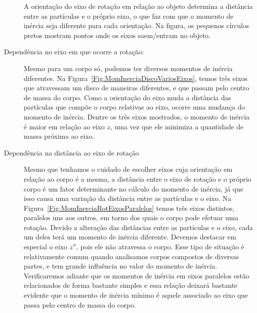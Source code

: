 \begin{description}
\begin{marginfigure}
\caption{A orientação do eixo de rotação em relação ao objeto determina a distância entre as partículas e o próprio eixo, o que faz com que o momento de inércia seja diferente para cada orientação. Na figura, os pequenos círculos pretos mostram pontos onde os eixos saem/entram no objeto. \label{Fig:MomInerciaDiscoVariosEixos}}
\end{marginfigure}
    \item[Dependência no eixo em que ocorre a rotação:] Mesmo para um corpo só, podemos ter diversos momentos de inércia diferentes. Na Figura~\ref{Fig:MomInerciaDiscoVariosEixos}, temos três eixos que atravessam um disco de maneiras diferentes, e que passam pelo centro de massa do corpo. Como a orientação do eixo muda a distância das partículas que compõe o corpo relativas ao eixo, ocorre uma mudança do momento de inércia. Dentre os três eixos mostrados, o momento de inércia é maior em relação ao eixo $z$, uma vez que ele minimiza a quantidade de massa próxima ao eixo.
    \item[Dependência na distância ao eixo de rotação] Mesmo que tenhamos o cuidado de escolher eixos cuja orientação em relação ao corpo é a mesma, a distância entre o eixo de rotação e o próprio corpo é um fator determinante no cálculo do momento de inércia, já que isso causa uma variação da distância entre as partículas e o eixo. Na Figura~\ref{Fig:MomInerciaRotEixosParalelos} temos três eixos distintos, paralelos uns aos outros, em torno dos quais o corpo pode efetuar uma rotação. Devido a alteração das distâncias entre as partículas e o eixo, cada um deles terá um momento de inércia diferente. Devemos destacar em especial o eixo $z''$, pois ele não atravessa o corpo. Esse tipo de situação é relativamente comum quando analisamos corpos compostos de diversas partes, e tem grande influência no valor do momento de inércia. Verificaremos adiante que os momentos de inércia em eixos paralelos estão relacionados de forma bastante simples e essa relação deixará bastante evidente que o momento de inércia mínimo é aquele associado ao eixo que passa pelo centro de massa do corpo.
\end{description}

